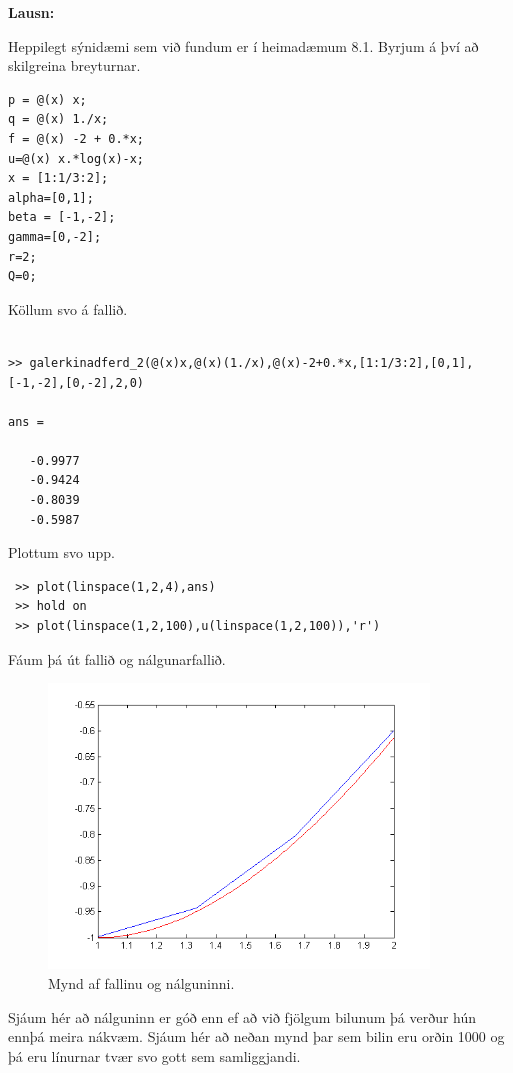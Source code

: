 \documentclass[11pt,a4paper,titlepage]{article}
\begin{document}
\par
\textbf{Lausn:}\par 
Heppilegt sýnidæmi sem við fundum er í heimadæmum 8.1. Byrjum á því að skilgreina breyturnar. 
\begin{verbatim}
p = @(x) x;
q = @(x) 1./x;
f = @(x) -2 + 0.*x;
u=@(x) x.*log(x)-x;
x = [1:1/3:2];
alpha=[0,1];
beta = [-1,-2];
gamma=[0,-2];
r=2;
Q=0;
\end{verbatim}
Köllum svo á fallið. 
\begin{verbatim}

>> galerkinadferd_2(@(x)x,@(x)(1./x),@(x)-2+0.*x,[1:1/3:2],[0,1],[-1,-2],[0,-2],2,0)

ans =

   -0.9977
   -0.9424
   -0.8039
   -0.5987
\end{verbatim}
 Plottum svo upp. 
 \begin{verbatim}
 >> plot(linspace(1,2,4),ans)
 >> hold on
 >> plot(linspace(1,2,100),u(linspace(1,2,100)),'r')
 \end{verbatim}
 
 Fáum þá út fallið og nálgunarfallið. 
 
  \begin{figure}[H]
      \centering
      \includegraphics[width=0.9\textwidth]{nalgun1_4.png}
      \caption{Mynd af fallinu og nálguninni.}
      \label{fig:awesome_image1}
  \end{figure}
  
  Sjáum hér að nálguninn er góð enn ef að við fjölgum bilunum þá verður hún ennþá meira nákvæm.  Sjáum hér að neðan mynd þar sem bilin eru orðin 1000 og þá eru línurnar tvær svo gott sem samliggjandi. 
  
\end{document}
